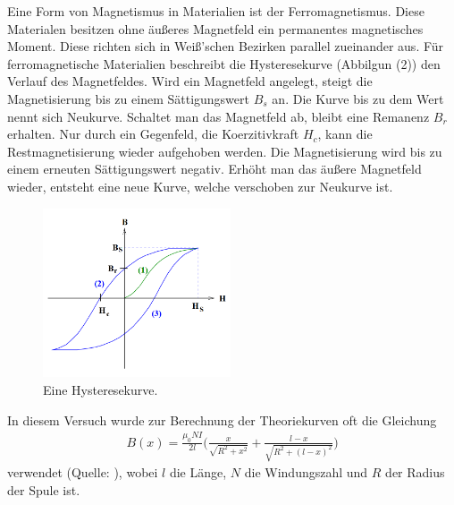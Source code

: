 \noindent Eine Form von Magnetismus in Materialien ist der Ferromagnetismus. Diese Materialen besitzen ohne äußeres Magnetfeld ein permanentes magnetisches Moment. 
Diese richten sich in Weiß'schen Bezirken parallel zueinander aus.
Für ferromagnetische Materialien beschreibt die Hysteresekurve (Abbilgun (2)) den Verlauf des Magnetfeldes.
Wird ein Magnetfeld angelegt, steigt die Magnetisierung bis zu einem Sättigungswert $B_s$ an. Die Kurve bis zu dem Wert nennt sich Neukurve.
Schaltet man das Magnetfeld ab, bleibt eine Remanenz $B_r$ erhalten. Nur durch ein Gegenfeld, die Koerzitivkraft $H_c$, kann die Restmagnetisierung wieder aufgehoben werden.
Die Magnetisierung wird bis zu einem erneuten Sättigungswert negativ. Erhöht man das äußere Magnetfeld wieder, entsteht eine neue Kurve, welche verschoben zur Neukurve ist.
\begin{figure}[H]
  \centering
  \includegraphics[height=5cm]{hysterese.png}
  \caption{Eine Hysteresekurve. \cite[S. 3]{sample}}
\end{figure}

In diesem Versuch wurde zur Berechnung der Theoriekurven oft die Gleichung
\begin{align}
B(x) = \frac{\mu_0 N I}{2l} \biggl( \frac{x}{\sqrt{R^{2} + x^{2}}} + \frac{l - x}{\sqrt{R^{2} + (l - x)^{2}}} \biggr) 
\end{align}
verwendet (Quelle: \cite[S. 5]{weltformel}), wobei $l$ die Länge, $N$ die Windungszahl und $R$ der 
Radius der Spule ist.